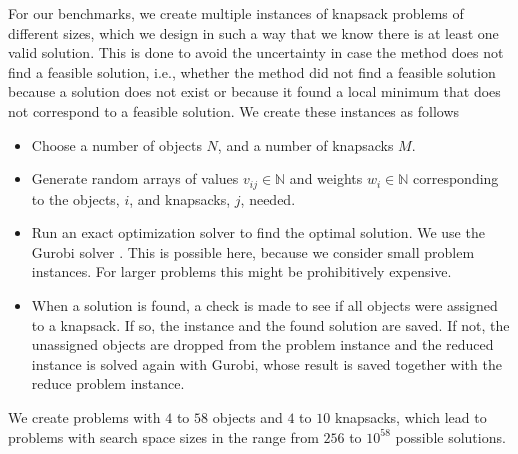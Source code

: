 For our benchmarks, we create multiple instances of knapsack problems of different sizes, which we design in such a way that we know there is at least one valid solution. This is done to avoid the uncertainty in case the method does not find a feasible solution, i.e., whether the method did not find a feasible solution because a solution does not exist or because it found a local minimum that does not correspond to a feasible solution. We create these instances as follows
\begin{itemize}
    \item Choose a number of objects $N$, and a number of knapsacks $M$.
    \item Generate random arrays of values $v_{ij}\in\mathbb{N}$ and weights $w_{i}\in\mathbb{N}$ corresponding to the objects, $i$, and knapsacks, $j$, needed.
    \item Run an exact optimization solver to find the optimal solution. We use the Gurobi solver \cite{gurobi}. This is possible here, because we consider small problem instances. For larger problems this might be prohibitively expensive. 
    \item When a solution is found, a check is made to see if all objects were assigned to a knapsack. If so, the instance and the found solution are saved. If not, the unassigned objects are dropped from the problem instance and the reduced instance is solved again with Gurobi, whose result is saved together with the reduce problem instance.
\end{itemize}
 We create problems with $4$ to $58$ objects and $4$ to $10$ knapsacks, which lead to problems with search space sizes in the  range from $256$ to $10^{58}$ possible solutions.

